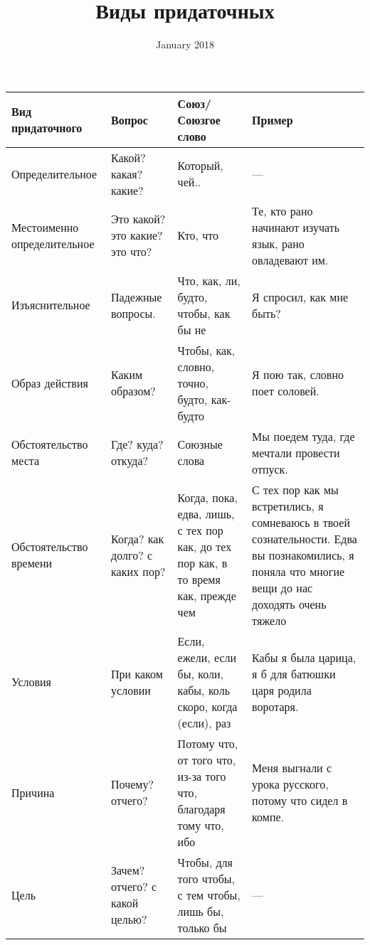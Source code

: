 \documentclass{article}
\title{Виды придаточных}
\date{January 2018}
\begin{document}
\maketitle

\begin{center}
    \begin{tabular}{ | p{3cm} | p{3cm} | p{3cm} | p{5cm} |}
    \hline
    \textbf{Вид придаточного} & \textbf{Вопрос} & \textbf{Союз/Союзгое слово} & \textbf{Пример} \\ \hline
    Определительное & Какой? какая? какие? & Который, чей.. & --- \\ \hline
    
    Местоименно определительное & Это какой? это какие? это что? & Кто, что & Те, кто рано начинают изучать язык, рано овладевают им. \\ \hline
    
    Изъяснительное & Падежные вопросы. & Что, как, ли, будто, чтобы, как бы не & Я спросил, как мне быть? \\ \hline
    
    Образ действия & Каким образом? & Чтобы, как, словно, точно, будто, как-будто & Я пою так, словно поет соловей. \\ \hline
    
    Обстоятельство места & Где? куда? откуда? & Союзные слова & Мы поедем туда, где мечтали провести отпуск. \\ \hline
    
    Обстоятельство времени & Когда? как долго? с каких пор? & Когда, пока, едва, лишь, с тех пор как, до тех пор как, в то время как, прежде чем & С тех пор как мы встретились, я сомневаюсь в твоей сознательности. \hfill \break Едва вы познакомились, я поняла что многие вещи до нас доходять очень тяжело \\ \hline
    
    Условия & При каком условии & Если, ежели, если бы, коли, кабы, коль скоро, когда (если), раз & Кабы я была царица, я б для батюшки царя родила воротаря.\\ \hline
    
    Причина & Почему? отчего? & Потому что, от того что, из-за того что, благодаря тому что, ибо & Меня выгнали с урока русского, потому что сидел в компе. \\ \hline
    
    Цель & Зачем? отчего? с какой целью? & Чтобы, для того чтобы, с тем чтобы, лишь бы, только бы & --- \\ \hline 
    
    \end{tabular}
\end{center}
\end{document}
